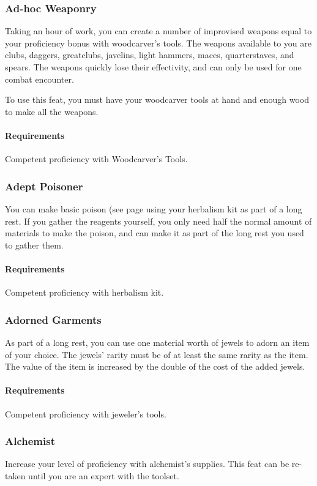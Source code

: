 \subsubsection{Ad-hoc Weaponry} \label{feat::adhocweaponry}
    Taking an hour of work, you can create a number of improvised weapons equal to your proficiency bonus with woodcarver's tools.
    The weapons available to you are clubs, daggers, greatclubs, javelins, light hammers, maces, quarterstaves, and spears.
    The weapons quickly lose their effectivity, and can only be used for one combat encounter.

    To use this feat, you must have your woodcarver tools at hand and enough wood to make all the weapons.
    \paragraph{Requirements} Competent proficiency with Woodcarver's Tools.
\subsubsection{Adept Poisoner} \label{feat::adeptpoisoner}
    You can make basic poison (see page \pageref{item::basicpoison} using your herbalism kit as part of a long rest.
    If you gather the reagents yourself, you only need half the normal amount of materials to make the poison, and can make it as part of the long rest you used to gather them.
    \paragraph{Requirements} Competent proficiency with herbalism kit.
\subsubsection{Adorned Garments} \label{feat::adornedgarments}
    As part of a long rest, you can use one material worth of jewels to adorn an item of your choice.
    The jewels' rarity must be of at least the same rarity as the item.
    The value of the item is increased by the double of the cost of the added jewels.
    \paragraph{Requirements} Competent proficiency with jeweler's tools.
\subsubsection{Alchemist} \label{feat::alchemist}
    Increase your level of proficiency with alchemist's supplies.
    This feat can be re-taken until you are an expert with the toolset.

